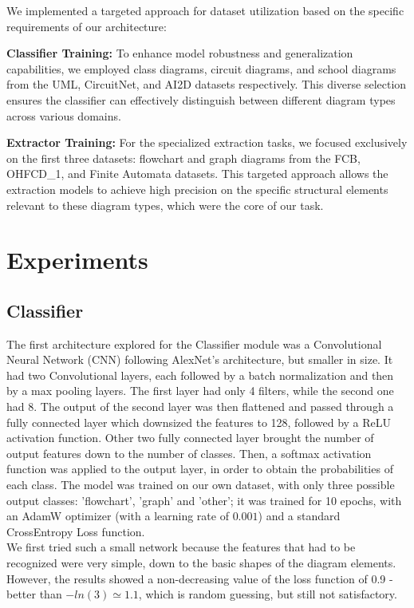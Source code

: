 \documentclass[conference]{IEEEtran}
\begin{document}
We implemented a targeted approach for dataset utilization based on the specific requirements of our architecture:

\textbf{Classifier Training:} To enhance model robustness and generalization capabilities, we employed class diagrams, circuit diagrams, and school diagrams from the UML, CircuitNet, and AI2D datasets respectively. This diverse selection ensures the classifier can effectively distinguish between different diagram types across various domains.

\textbf{Extractor Training:} For the specialized extraction tasks, we focused exclusively on the first three datasets: flowchart and graph diagrams from the FCB, OHFCD\_1, and Finite Automata datasets. This targeted approach allows the extraction models to achieve high precision on the specific structural elements relevant to these diagram types, which were the core of our task.


\section{Experiments}

\subsection{Classifier}
\label{exp:classifier}
The first architecture explored for the Classifier module was a Convolutional Neural Network (CNN) following AlexNet's architecture, but smaller in size.
It had two Convolutional layers, each followed by a batch normalization and then by a max pooling layers. The first layer had only 4 filters, while the second one had 8.
The output of the second layer was then flattened and passed through a fully connected layer which downsized the features to 128, followed by a ReLU activation function. Other two fully connected layer brought the number of output features down to the number of classes.
Then, a softmax activation function was applied to the output layer, in order to obtain the probabilities of each class.
The model was trained on our own dataset, with only three possible output classes: 'flowchart', 'graph' and 'other'; it was trained for 10 epochs, with an AdamW optimizer (with a learning rate of $0.001$) and a standard CrossEntropy Loss function.
\\

We first tried such a small network because the features that had to be recognized were very simple, down to the basic shapes of the diagram elements.
However, the results showed a non-decreasing value of the loss function of 0.9 - better than $-ln(3) \simeq 1.1$, which is random guessing, but still not satisfactory.
\\
\end{document}
